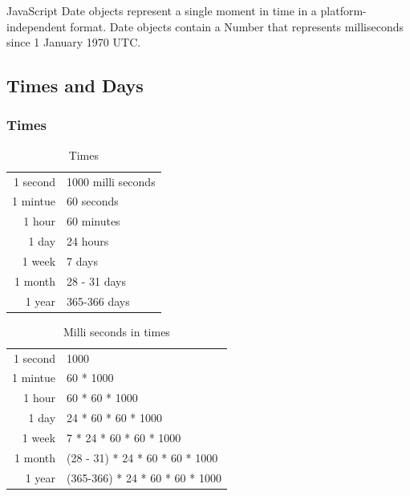 \documentclass[10pt]{article}
\begin{document}
\vbox{JavaScript Date objects represent a single moment in time in a platform-independent format. Date objects contain a Number that represents milliseconds since 1 January 1970 UTC.}

\subsection{Times and Days}

\subsubsection{Times}
\begin{table}[h!]
	\centering
	\begin{tabular}{ r l }
		1 second & 1000 milli seconds \\
		\rowcolor{Gray}
		1 mintue & 60 seconds \\  
		1 hour & 60 minutes \\
		\rowcolor{Gray}
		1 day & 24 hours \\
		1 week & 7 days \\
		\rowcolor{Gray}
		1 month & 28 - 31 days \\
		1 year & 365-366 days
	\end{tabular}
	\caption{Times}
\end{table}

\begin{table}[h!]
	\centering
	\begin{tabular}{ r l }
		1 second & 1000 \\
		\rowcolor{Gray}
		1 mintue & 60 * 1000 \\  
		1 hour & 60 * 60 * 1000 \\
		\rowcolor{Gray}
		1 day & 24 * 60 * 60 * 1000 \\
		1 week & 7 * 24 * 60 * 60 * 1000 \\
		\rowcolor{Gray}
		1 month & (28 - 31) * 24 * 60 * 60 * 1000  \\
		1 year & (365-366) * 24 * 60 * 60 * 1000
	\end{tabular}
	\caption{Milli seconds in times}
\end{table}
\end{document}
